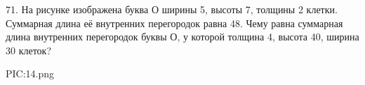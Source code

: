 71. На рисунке изображена буква О ширины 5, высоты 7, толщины 2 клетки. Суммарная длина её внутренних перегородок равна 48. Чему равна суммарная длина внутренних перегородок буквы О, у которой толщина 4, высота 40, ширина 30 клеток?
\begin{center}
{{PIC:14.png}}
\end{center}
